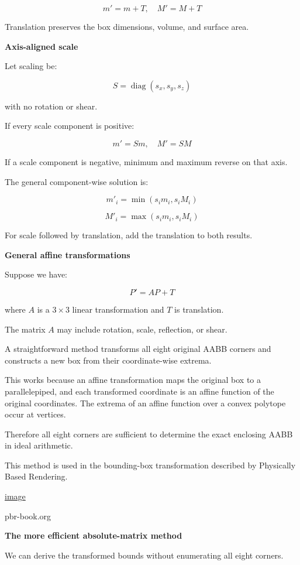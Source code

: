 \[
\boxed{ m'=m+T,\quad M'=M+T }
\]

Translation preserves the box dimensions, volume, and surface area.

\textbf{Axis-aligned scale}

Let scaling be:

\[
S=\operatorname{diag}(s_x,s_y,s_z)
\]

with no rotation or shear.

If every scale component is positive:

\[
m'=Sm,\quad M'=SM
\]

If a scale component is negative, minimum and maximum reverse on that axis.

The general component-wise solution is:

\[
\boxed{ m'_i=\min(s_im_i,s_iM_i) }
\]

\[
\boxed{ M'_i=\max(s_im_i,s_iM_i) }
\]

For scale followed by translation, add the translation to both results.

\textbf{General affine transformations}

Suppose we have:

\[
\boxed{ P'=AP+T }
\]

where \(A\) is a \(3\times3\) linear transformation and \(T\) is translation.

The matrix \(A\) may include rotation, scale, reflection, or shear.

A straightforward method transforms all eight original AABB corners and constructs a new box from their coordinate-wise extrema.

This works because an affine transformation maps the original box to a parallelepiped, and each transformed coordinate is an affine function of the original coordinates. The extrema of an affine function over a convex polytope occur at vertices.

Therefore all eight corners are sufficient to determine the exact enclosing AABB in ideal arithmetic.

This method is used in the bounding-box transformation described by Physically Based Rendering. 

\href{https://www.google.com/s2/favicons?domain=https://www.pbr-book.org&sz=32}{image}

pbr-book.org

\textbf{The more efficient absolute-matrix method}

We can derive the transformed bounds without enumerating all eight corners.

